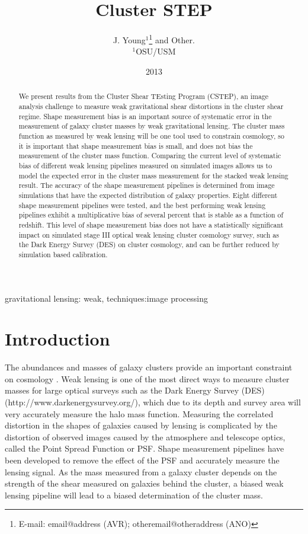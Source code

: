 \documentclass[useAMS,usenatbib]{mn2e}
\title[Cluster Shear TEsting Program]{Cluster STEP}
\author[J. Young and Other]{J. Young$^{1}$\thanks{E-mail:
email@address (AVR); otheremail@otheraddress (ANO)} and 
Other.\\
$^{1}$OSU/USM \\
}
\begin{document}
\date{2013}

\pagerange{\pageref{firstpage}--\pageref{lastpage}} 

\maketitle

\label{firstpage}

\begin{abstract}
We present results from the Cluster Shear TEsting Program (CSTEP), an image
analysis challenge to measure weak gravitational shear distortions in
the cluster shear regime. Shape measurement bias is an important source of systematic error in the 
measurement of galaxy cluster masses by weak gravitational lensing. The
cluster mass function as measured by weak lensing will be one tool
used to constrain cosmology, so it is important that shape measurement
bias is small, and does not bias the measurement of the cluster mass function. Comparing the current level of systematic bias of different 
weak lensing pipelines measured on simulated images allows us to model the expected error
in the cluster mass measurement for the stacked weak lensing
result. The accuracy of the shape measurement pipelines is determined from image simulations
that have the expected distribution of galaxy properties. Eight 
different shape measurement pipelines were tested, and the best performing weak
lensing pipelines exhibit a multiplicative bias of several percent 
that is stable as a function of redshift. This level of shape measurement bias does not have a statistically
significant impact on simulated stage III optical weak lensing cluster
cosmology survey, such as the Dark Energy Survey (DES) on cluster cosmology, and can be further reduced by simulation based calibration.
\end{abstract}

\begin{keywords}
gravitational lensing: weak, techniques:image processing
\end{keywords}


\section{Introduction}
The abundances and masses of galaxy clusters provide an important constraint on 
cosmology \citep{obscos}. Weak lensing is one of the most direct ways to measure cluster
masses for large optical surveys such as the Dark Energy Survey (DES)
(http://www.darkenergysurvey.org/), which due to its depth and
survey area will very accurately measure the halo mass function.
Measuring the correlated distortion in the shapes of galaxies caused by lensing is complicated
by the distortion of observed images caused by the atmosphere and telescope optics, called the 
Point Spread Function or PSF. Shape measurement pipelines have been developed to remove the 
effect of the PSF and accurately measure the lensing signal. As the
mass measured from a galaxy cluster depends on the strength of the
shear measured on galaxies behind the cluster, a biased weak lensing
pipeline will lead to a biased determination of the cluster mass.
 
\end{document}
